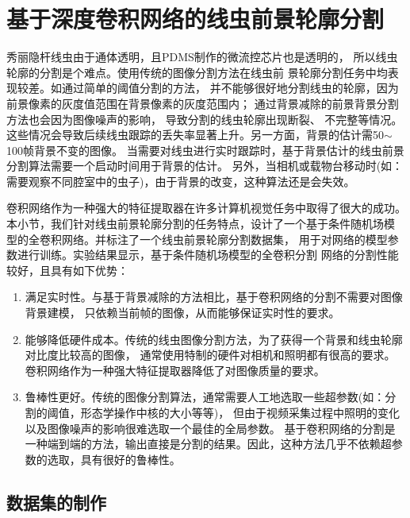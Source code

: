 \section{基于深度卷积网络的线虫前景轮廓分割}
秀丽隐杆线虫由于通体透明，且PDMS制作的微流控芯片也是透明的，
所以线虫轮廓的分割是个难点。使用传统的图像分割方法在线虫前
景轮廓分割任务中均表现较差。如通过简单的阈值分割的方法\cite{otsu1979threshold}，
并不能够很好地分割线虫的轮廓，因为前景像素的灰度值范围在背景像素的灰度范围内；
通过背景减除的前景背景分割方法\cite{zivkovic2006efficient}也会因为图像噪声的影响，
导致分割的线虫轮廓出现断裂、
不完整等情况。这些情况会导致后续线虫跟踪的丢失率显著上升。另一方面，背景的估计需50$\sim$100帧背景不变的图像。
当需要对线虫进行实时跟踪时，基于背景估计的线虫前景分割算法需要一个启动时间用于背景的估计。
另外，当相机或载物台移动时(如：需要观察不同腔室中的虫子)，由于背景的改变，这种算法还是会失效。

卷积网络作为一种强大的特征提取器在许多计算机视觉任务中取得了很大的成功。
本小节，我们针对线虫前景轮廓分割的任务特点，设计了一个基于条件随机场模
型的全卷积网络。并标注了一个线虫前景轮廓分割数据集，
用于对网络的模型参数进行训练。实验结果显示，基于条件随机场模型的全卷积分割
网络的分割性能较好，且具有如下优势：
	
\begin{enumerate}
  \item 满足实时性。与基于背景减除的方法相比，基于卷积网络的分割不需要对图像背景建模，
  只依赖当前帧的图像，从而能够保证实时性的要求。
  \item 能够降低硬件成本。传统的线虫图像分割方法，为了获得一个背景和线虫轮廓对比度比较高的图像，
  通常使用特制的硬件对相机和照明都有很高的要求。卷积网络作为一种强大特征提取器降低了对图像质量的要求。
  \item 鲁棒性更好。传统的图像分割算法，通常需要人工地选取一些超参数(如：分割的阈值，形态学操作中核的大小等等)，
  但由于视频采集过程中照明的变化以及图像噪声的影响很难选取一个最佳的全局参数。
基于卷积网络的分割是一种端到端的方法，输出直接是分割的结果。因此，这种方法几乎不依赖超参数的选取，具有很好的鲁棒性。
\end{enumerate}
\subsection{数据集的制作}
